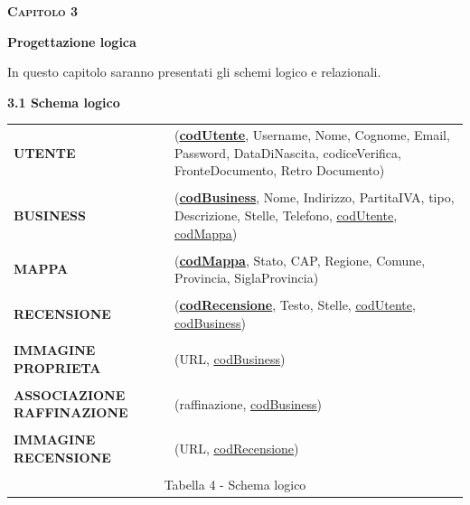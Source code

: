 \documentclass[a4paper,12pt]{article}
\def\doubleunderline#1{\underline{\underline{#1}}}
\begin{document}
\newpage\null{}\setcounter{page}{12}
\begin{flushleft}
\vspace*{+1cm}
\Large\textsc{\bf Capitolo 3}
\vspace*{+1cm}

\begingroup
\fontsize{30pt}{12pt}\selectfont\bf{Progettazione logica}
\endgroup
\vspace*{+1cm}

\normalsize{
In questo capitolo saranno presentati gli schemi logico e relazionali.
}

\vspace*{+1cm}
{\bf 3.1 Schema logico}
\vspace*{+0.5cm}

\begin{table}[htbp]
\begin{tabular}[c]{ p{3.5cm}  p{11.5cm} }
\setlength{\extrarowheight}{20pt}
{\bf UTENTE}
&({\bf \underline{codUtente}}, Username, Nome, Cognome, Email, Password, DataDiNascita, 
codiceVerifica, FronteDocumento, Retro Documento)
\\
\\
{\bf BUSINESS}
&({\bf \underline{codBusiness}}, Nome, Indirizzo, PartitaIVA, tipo, Descrizione, Stelle, Telefono,
\doubleunderline{codUtente}, \doubleunderline{codMappa})
\\
\\
{\bf MAPPA}
&({\bf \underline{codMappa}}, Stato, CAP, Regione, Comune, Provincia, SiglaProvincia)
\\
\\
{\bf RECENSIONE}
&({\bf \underline{codRecensione}}, Testo, Stelle, \doubleunderline{codUtente}, \doubleunderline{codBusiness})
\\
\\
{\bf IMMAGINE
PROPRIETA}
&(URL, \doubleunderline{codBusiness})
\\
\\
{\bf ASSOCIAZIONE
RAFFINAZIONE}
&(raffinazione, \doubleunderline{codBusiness})
\\
\\
{\bf IMMAGINE
RECENSIONE}
&(URL, \doubleunderline{codRecensione})
\\
\\
\multicolumn{2}{c}{\footnotesize{\normalsize Tabella 4 - Schema logico}}
\end{tabular}
\end{table}
\end{flushleft}
\newpage
\end{document}
